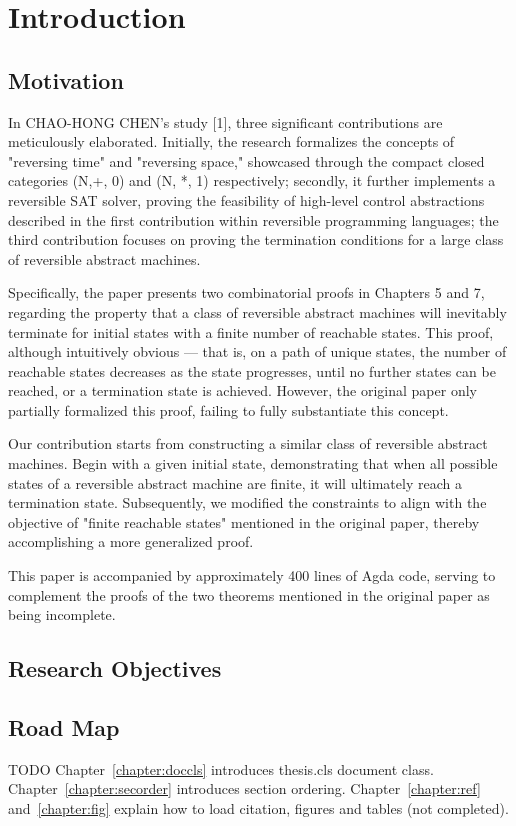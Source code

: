 \chapter{Introduction}
\label{chapter:intro}


\section{Motivation}

In CHAO-HONG CHEN's study [1], three significant contributions are meticulously elaborated. 
Initially, the research formalizes the concepts of "reversing time" and "reversing space," showcased through the compact closed categories (N,+, 0) and (N, *, 1) respectively; 
secondly, it further implements a reversible SAT solver, proving the feasibility of high-level control abstractions described in the first contribution within reversible programming languages; 
the third contribution focuses on proving the termination conditions for a large class of reversible abstract machines.

Specifically, the paper presents two combinatorial proofs in Chapters 5 and 7, regarding the property that a class of reversible abstract machines will inevitably terminate for initial states with a finite number of reachable states. 
This proof, although intuitively obvious — that is, on a path of unique states, the number of reachable states decreases as the state progresses, until no further states can be reached, or a termination state is achieved. 
However, the original paper only partially formalized this proof, failing to fully substantiate this concept.

Our contribution starts from constructing a similar class of reversible abstract machines. 
Begin with a given initial state, demonstrating that when all possible states of a reversible abstract machine are finite, it will ultimately reach a termination state.
Subsequently, we modified the constraints to align with the objective of "finite reachable states" mentioned in the original paper, thereby accomplishing a more generalized proof.

This paper is accompanied by approximately 400 lines of Agda code, serving to complement the proofs of the two theorems mentioned in the original paper as being incomplete.

\section{Research Objectives}


\section{Road Map}
TODO
Chapter~\ref{chapter:doccls} introduces thesis.cls document class.
Chapter~\ref{chapter:secorder} introduces section ordering.
Chapter~\ref{chapter:ref} and~\ref{chapter:fig} explain how to load citation, figures and tables (not completed).